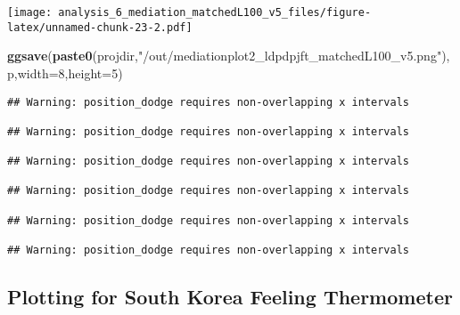 \documentclass[
]{article}
\newenvironment{Shaded}{\begin{snugshade}}{\end{snugshade}}
\newcommand{\DataTypeTok}[1]{\textcolor[rgb]{0.13,0.29,0.53}{#1}}
\newcommand{\DecValTok}[1]{\textcolor[rgb]{0.00,0.00,0.81}{#1}}
\newcommand{\KeywordTok}[1]{\textcolor[rgb]{0.13,0.29,0.53}{\textbf{#1}}}
\newcommand{\NormalTok}[1]{#1}
\newcommand{\StringTok}[1]{\textcolor[rgb]{0.31,0.60,0.02}{#1}}
\begin{document}
\texttt{[image: analysis\_6\_mediation\_matchedL100\_v5\_files/figure-latex/unnamed-chunk-23-2.pdf]}

\begin{Shaded}
\begin{Highlighting}[]
\KeywordTok{ggsave}\NormalTok{(}\KeywordTok{paste0}\NormalTok{(projdir,}\StringTok{"/out/mediationplot2_ldpdpjft_matchedL100_v5.png"}\NormalTok{),p,}\DataTypeTok{width=}\DecValTok{8}\NormalTok{,}\DataTypeTok{height=}\DecValTok{5}\NormalTok{)}
\end{Highlighting}
\end{Shaded}

\begin{verbatim}
## Warning: position_dodge requires non-overlapping x intervals

## Warning: position_dodge requires non-overlapping x intervals

## Warning: position_dodge requires non-overlapping x intervals

## Warning: position_dodge requires non-overlapping x intervals

## Warning: position_dodge requires non-overlapping x intervals

## Warning: position_dodge requires non-overlapping x intervals
\end{verbatim}

\hypertarget{plotting-for-south-korea-feeling-thermometer}{%
\subsection{Plotting for South Korea Feeling
Thermometer}\label{plotting-for-south-korea-feeling-thermometer}}
\end{document}
